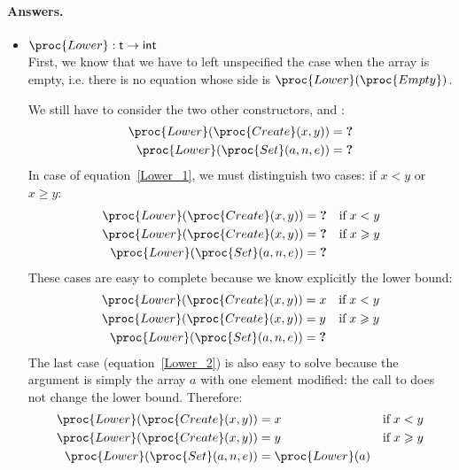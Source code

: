 \paragraph{Answers.}

\begin{itemize}

  \item \(\proc{Lower} : \type{t} \rightarrow \type{int}\)\\
  First, we know that we have to left unspecified the case when the
  array is empty, i.e. there is no equation whose side is
  \(\proc{Lower} (\proc{Empty})\).

  We still have to consider the two other constructors, 
  and :
  \begin{align}
       \proc{Lower} (\proc{Create} (x, y))
    &= \textbf{?} \label{Lower_1}\\
       \proc{Lower} (\proc{Set} (a, n, e))
    &= \textbf{?} \label{Lower_2}
  \end{align}
  In case of equation~\ref{Lower_1}, we must distinguish two cases: if
  \(x < y\) or \(x \geqslant y\):
  \begin{align*}
       \proc{Lower} (\proc{Create} (x, y))
    &= \textbf{?}
    &  \text{if} \;x < y\\
       \proc{Lower} (\proc{Create} (x, y))
    &= \textbf{?}
    &  \text{if} \;x \geqslant y\\
       \proc{Lower} (\proc{Set} (a, n, e))
    &= \textbf{?}
  \end{align*}
  These cases are easy to complete because we know explicitly the
  lower bound:
  \begin{align*}
       \proc{Lower} (\proc{Create} (x, y))
    &= x
    &  \text{if} \;x < y\\
       \proc{Lower} (\proc{Create} (x, y))
    &= y
    &  \text{if} \;x \geqslant y\\
       \proc{Lower} (\proc{Set} (a, n, e))
    &= \textbf{?}
  \end{align*}
  The last case (equation~\ref{Lower_2}) is also easy to solve because
  the argument is simply the array \(a\) with one element modified:
  the call to  does not change the lower bound. Therefore:
  \begin{align*}
       \proc{Lower} (\proc{Create} (x, y))
    &= x
    &  \text{if} \;x < y\\
       \proc{Lower} (\proc{Create} (x, y))
    &= y
    &  \text{if} \;x \geqslant y\\
       \proc{Lower} (\proc{Set} (a, n, e))
    &= \proc{Lower} (a)
  \end{align*}


\end{itemize}
